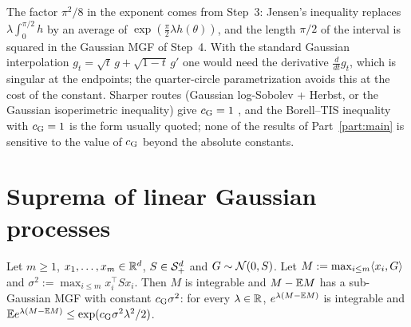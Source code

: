 \begin{remark}\label{rem:pc_constant}
The factor $\pi^2/8$ in the exponent comes from Step~3: Jensen's inequality replaces
$\lambda\int_0^{\pi/2}h$ by an average of $\exp(\frac\pi2\lambda h(\theta))$, and the length
$\pi/2$ of the interval is squared in the Gaussian MGF of Step~4. With the standard
Gaussian interpolation $g_t = \sqrt t\,g + \sqrt{1-t}\,g'$ one would need the derivative
$\frac{d}{dt}g_t$, which is singular at the endpoints; the quarter-circle parametrization
avoids this at the cost of the constant. Sharper routes (Gaussian log-Sobolev + Herbst, or
the Gaussian isoperimetric inequality) give $c_{\mathrm{G}} = 1$ \cite{boucheron2013concentration,
adler2007random}, and the Borell--TIS inequality with $c_{\mathrm{G}} = 1$ is the form usually quoted;
none of the results of Part~\ref{part:main} is sensitive to the value of $c_{\mathrm{G}}$ beyond the
absolute constants.
\end{remark}

\section{Suprema of linear Gaussian processes}
\label{sec:pre_concentration_sup}

\begin{lemma}
\label{lem:finite_sup_subgaussian}
\leanok
{}
Let $m \ge 1$, $x_1,\dots,x_m \in \mathbb{R}^d$, $S \in \mathcal{S}_{+}^{d}$ and $G \sim \mathcal{N}(0,S)$. Let
$M := \max_{i\le m}\langle x_i, G \rangle$ and $\sigma^2 := \max_{i\le m}x_i^\top Sx_i$. Then $M$ is
integrable and $M - \mathbb{E} M$ has a sub-Gaussian MGF with constant $c_{\mathrm{G}}\sigma^2$: for every
$\lambda\in\mathbb{R}$, $e^{\lambda(M - \mathbb{E} M)}$ is integrable and
$\mathbb{E} e^{\lambda(M-\mathbb{E} M)} \le \exp(c_{\mathrm{G}}\sigma^2\lambda^2/2)$.
\end{lemma}

